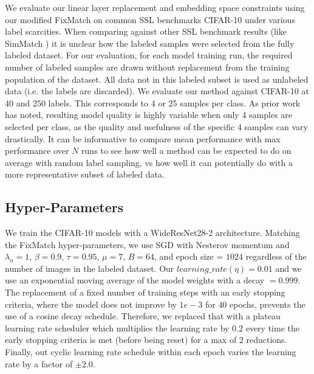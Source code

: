 \documentclass[10pt,twocolumn,letterpaper]{article}
\begin{document}
We evaluate our linear layer replacement and embedding space constraints using our modified FixMatch on common SSL benchmarks CIFAR-10 \cite{cifar10} under various label scarcities. 
When comparing against other SSL benchmark results (like SimMatch \cite{zheng2022simmatch}) it is unclear how the labeled samples were selected from the fully labeled dataset. 
For our evaluation, for each model training run, the required number of labeled samples are drawn without replacement from the training population of the dataset.
All data not in this labeled subset is used as unlabeled data (i.e. the labels are discarded).
We evaluate our method against CIFAR-10 at 40 and 250 labels. %
This corresponds to 4 or 25 samples per class.
As prior work \cite{sohn2020fixmatch} has noted, resulting model quality is highly variable when only 4 samples are selected per class, as the quality and usefulness of the specific 4 samples can vary drastically. 
It can be informative to compare mean performance with max performance over $N$ runs to see how well a method can be expected to do on average with random label sampling, vs how well it can potentially do with a more representative subset of labeled data.

\subsection{Hyper-Parameters}


We train the CIFAR-10 models with a WideResNet28-2 architecture.
Matching the FixMatch \cite{sohn2020fixmatch} hyper-parameters, we use SGD with Nesterov momentum and $\lambda_u = 1$, $\beta = 0.9$, $\tau = 0.95$, $\mu = 7$, $B = 64$, and epoch size = $1024$ regardless of the number of images in the labeled dataset.
Our $learning\_rate (\eta) = 0.01$ and we use an exponential moving average of the model weights with a decay $=0.999$.
The replacement of a fixed number of training steps with an early stopping criteria, where the model does not improve by $1e-3$ for $40$ epochs, prevents the use of a cosine decay schedule.
Therefore, we replaced that with a plateau learning rate scheduler which multiplies the learning rate by $0.2$ every time the early stopping criteria is met (before being reset) for a max of 2 reductions.
Finally, out cyclic learning rate schedule within each epoch varies the learning rate by a factor of $\pm2.0$.
\end{document}
